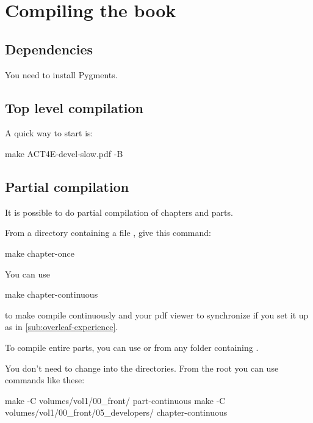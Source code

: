 

\section{Compiling the book}

\subsection{Dependencies}

You need to install Pygments.

\subsection{Top level compilation}

A quick way to start is:

\begin{console}
    make ACT4E-devel-slow.pdf -B
\end{console}

\subsection{Partial compilation}

It is possible to do partial compilation of chapters and parts.


From a directory containing a file , give this command:

\begin{console}
    make chapter-once
\end{console}

You can use
%
\begin{console}
    make chapter-continuous
\end{console}
%
to make  compile continuously and your pdf viewer to synchronize if you set it up as in \cref{sub:overleaf-experience}.

To compile entire parts, you can use  or  from any folder containing
.

You don't need to change into the directories.
From the root you can use commands like these:
%
\begin{console}
    make -C volumes/vol1/00_front/ part-continuous
    make -C volumes/vol1/00_front/05_developers/ chapter-continuous
\end{console}


